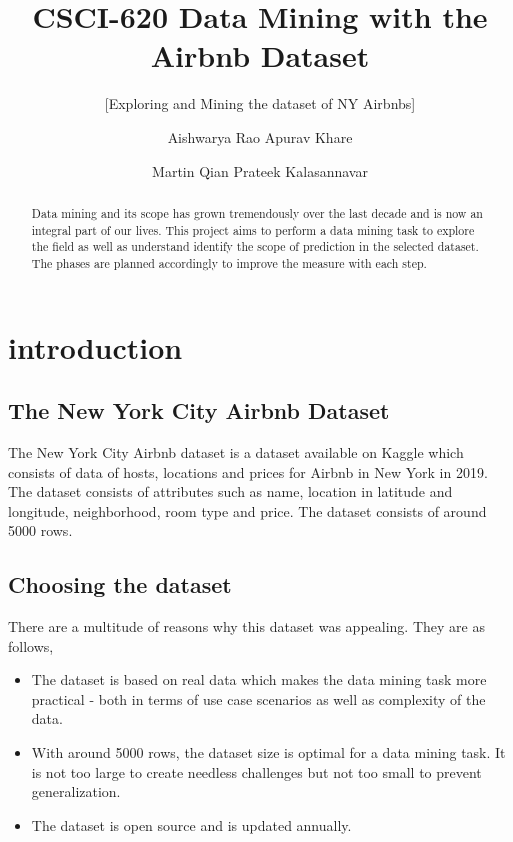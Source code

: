 \documentclass{sig-alternate}
\begin{document}
	\title{CSCI-620 Data Mining with the Airbnb Dataset}
	\subtitle{[Exploring and Mining the dataset of NY Airbnbs]}
	
	\author
	{
		\alignauthor
		Aishwarya Rao
		\alignauthor
		Apurav Khare
		\and
		\alignauthor
		Martin Qian
		\alignauthor
		Prateek Kalasannavar
	}
	
	\maketitle
	\begin{abstract}
		
		Data mining and its scope has grown tremendously over the last decade and is now an integral part of our lives. This project aims to perform a data mining task to explore the field as well as understand identify the scope of prediction in the selected dataset. The phases are planned accordingly to improve the measure with each step. 
		
	\end{abstract}
	
	\section{introduction}
	
	\subsection{The New York City Airbnb Dataset}
	The New York City Airbnb dataset is a dataset available on Kaggle which consists of data of hosts, locations and prices for Airbnb in New York in 2019. The dataset consists of attributes such as name, location in latitude and longitude, neighborhood, room type and price. The dataset consists of around 5000 rows. 
	
	\subsection{Choosing the dataset}
	There are a multitude of reasons why this dataset was appealing. They are as follows,
	\begin{itemize}
		\item The dataset is based on real data which makes the data mining task more practical - both in terms of use case scenarios as well as complexity of the data.
		\item With around 5000 rows, the dataset size is optimal for a data mining task. It is not too large to create needless challenges but not too small to prevent generalization.
		\item The dataset is open source and is updated annually. 
	\end{itemize}
	
\end{document}
